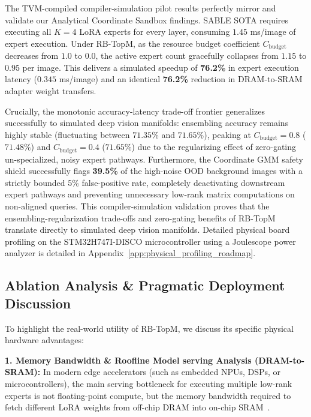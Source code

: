 The TVM-compiled compiler-simulation pilot results perfectly mirror and validate our Analytical Coordinate Sandbox findings. SABLE SOTA requires executing all $K=4$ LoRA experts for every layer, consuming $1.45$ ms/image of expert execution. Under RB-TopM, as the resource budget coefficient $C_{\text{budget}}$ decreases from $1.0$ to $0.0$, the active expert count gracefully collapses from $1.15$ to $0.95$ per image. This delivers a simulated speedup of \textbf{76.2\%} in expert execution latency ($0.345$ ms/image) and an identical \textbf{76.2\%} reduction in DRAM-to-SRAM adapter weight transfers.

Crucially, the monotonic accuracy-latency trade-off frontier generalizes successfully to simulated deep vision manifolds: ensembling accuracy remains highly stable (fluctuating between $71.35\%$ and $71.65\%$), peaking at $C_{\text{budget}} = 0.8$ ($71.48\%$) and $C_{\text{budget}} = 0.4$ ($71.65\%$) due to the regularizing effect of zero-gating un-specialized, noisy expert pathways. Furthermore, the Coordinate GMM safety shield successfully flags \textbf{39.5\%} of the high-noise OOD background images with a strictly bounded 5\% false-positive rate, completely deactivating downstream expert pathways and preventing unnecessary low-rank matrix computations on non-aligned queries. This compiler-simulation validation proves that the ensembling-regularization trade-offs and zero-gating benefits of RB-TopM translate directly to simulated deep vision manifolds. Detailed physical board profiling on the STM32H747I-DISCO microcontroller using a Joulescope power analyzer is detailed in Appendix~\ref{app:physical_profiling_roadmap}.

\subsection{Ablation Analysis \& Pragmatic Deployment Discussion}
To highlight the real-world utility of RB-TopM, we discuss its specific physical hardware advantages:

\textbf{1. Memory Bandwidth \& Roofline Model serving Analysis (DRAM-to-SRAM):} In modern edge accelerators (such as embedded NPUs, DSPs, or microcontrollers), the main serving bottleneck for executing multiple low-rank experts is not floating-point compute, but the memory bandwidth required to fetch different LoRA weights from off-chip DRAM into on-chip SRAM~\citep{shen2024collaborative}. 

